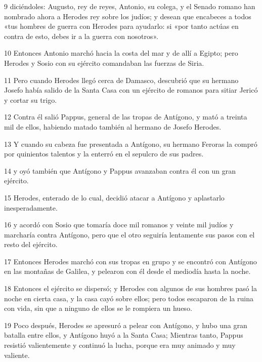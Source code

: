 \par 9 diciéndoles: Augusto, rey de reyes, Antonio, su colega, y el Senado romano han nombrado ahora a Herodes rey sobre los judíos; y desean que encabeces a todos «tus hombres de guerra con Herodes para ayudarlo: si «por tanto actúas en contra de esto, debes ir a la guerra con nosotros».

\par 10 Entonces Antonio marchó hacia la costa del mar y de allí a Egipto; pero Herodes y Sosio con su ejército comandaban las fuerzas de Siria.

\par 11 Pero cuando Herodes llegó cerca de Damasco, descubrió que su hermano Josefo había salido de la Santa Casa con un ejército de romanos para sitiar Jericó y cortar su trigo.

\par 12 Contra él salió Pappus, general de las tropas de Antígono, y mató a treinta mil de ellos, habiendo matado también al hermano de Josefo Herodes.

\par 13 Y cuando su cabeza fue presentada a Antígono, su hermano Feroras la compró por quinientos talentos y la enterró en el sepulcro de sus padres.

\par 14 y oyó también que Antígono y Pappus avanzaban contra él con un gran ejército.

\par 15 Herodes, enterado de lo cual, decidió atacar a Antígono y aplastarlo inesperadamente.

\par 16 y acordó con Sosio que tomaría doce mil romanos y veinte mil judíos y marcharía contra Antígono, pero que el otro seguiría lentamente sus pasos con el resto del ejército.

\par 17 Entonces Herodes marchó con sus tropas en grupo y se encontró con Antígono en las montañas de Galilea, y pelearon con él desde el mediodía hasta la noche.

\par 18 Entonces el ejército se dispersó; y Herodes con algunos de sus hombres pasó la noche en cierta casa, y la casa cayó sobre ellos; pero todos escaparon de la ruina con vida, sin que a ninguno de ellos se le rompiera un hueso.

\par 19 Poco después, Herodes se apresuró a pelear con Antígono, y hubo una gran batalla entre ellos, y Antígono huyó a la Santa Casa; Mientras tanto, Pappus resistió valientemente y continuó la lucha, porque era muy animado y muy valiente.

